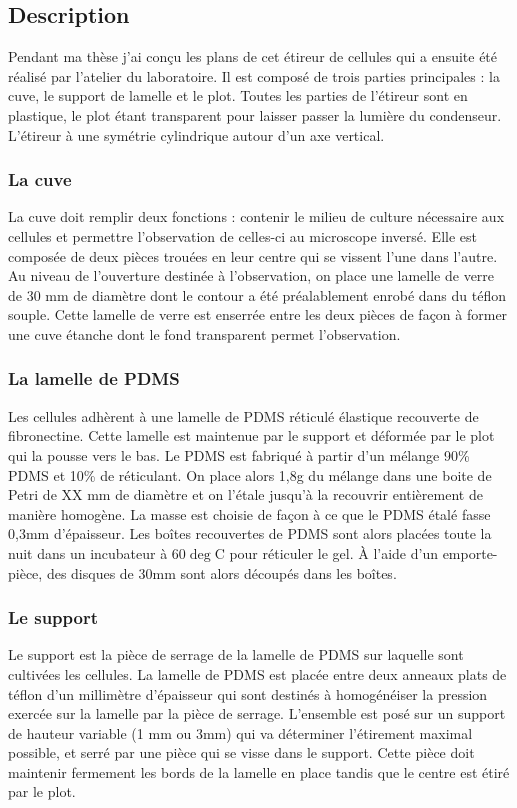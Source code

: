 \documentclass{report}
\begin{document}
	\subsection{Description}
	Pendant ma thèse j'ai conçu les plans de cet étireur de cellules qui a ensuite été réalisé par l'atelier du laboratoire. Il est composé de trois parties principales : la cuve, le support de lamelle et le plot. Toutes les parties de l'étireur sont en plastique, le plot étant transparent pour laisser passer la lumière du condenseur. L'étireur à une symétrie cylindrique autour d'un axe vertical. 
	\subsubsection{La cuve}
	La cuve doit remplir deux fonctions : contenir le milieu de culture nécessaire aux cellules et permettre l'observation de celles-ci au microscope inversé. Elle est composée de deux pièces trouées en leur centre qui se vissent l'une dans l'autre. Au niveau de l'ouverture destinée à l'observation, on place une lamelle de verre de 30 mm de diamètre dont le contour a été préalablement enrobé dans du téflon souple. Cette lamelle de verre est enserrée entre les deux pièces de façon à former une cuve étanche dont le fond transparent permet l'observation.
	\subsubsection{La lamelle de PDMS} 
	Les cellules adhèrent à une lamelle de PDMS réticulé élastique recouverte de fibronectine. Cette lamelle est maintenue par le support et déformée par le plot qui la pousse vers le bas. 
	Le PDMS est fabriqué à partir d'un mélange 90\% PDMS et 10\% de réticulant. On place alors 1,8g du mélange dans une boite de Petri de XX mm de diamètre et on l'étale jusqu'à la recouvrir entièrement de manière homogène. La masse est choisie de façon à ce que le PDMS étalé fasse 0,3mm d'épaisseur. Les boîtes recouvertes de PDMS sont alors placées toute la nuit dans un incubateur à 60$\deg$C pour réticuler le gel. À l'aide d'un emporte-pièce, des disques de 30mm sont alors découpés dans les boîtes.

		
	\subsubsection{Le support}
	Le support est la pièce de serrage de la lamelle de PDMS sur laquelle sont cultivées les cellules. La lamelle de PDMS est placée entre deux anneaux plats de téflon d'un millimètre d'épaisseur qui sont destinés à homogénéiser la pression exercée sur la lamelle par la pièce de serrage. L'ensemble est posé sur un support de hauteur variable (1 mm ou 3mm) qui va déterminer l'étirement maximal possible, et serré par une pièce qui se visse dans le support. 
	Cette pièce doit maintenir fermement les bords de la lamelle en place tandis que le centre est étiré par le plot. 
\end{document}
